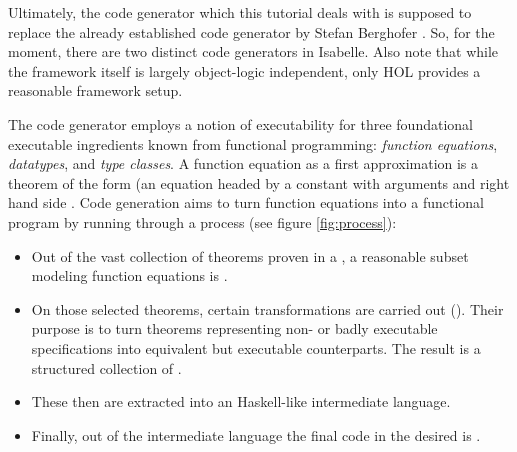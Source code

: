 \begin{isabellebody}
\begin{isamarkuptext}
  \begin{warn}
    Ultimately, the code generator which this tutorial deals with
    is supposed to replace the already established code generator
    by Stefan Berghofer \cite{Berghofer-Nipkow:2002}.
    So, for the moment, there are two distinct code generators
    in Isabelle.
    Also note that while the framework itself is largely
    object-logic independent, only HOL provides a reasonable
    framework setup.    
  \end{warn}%
\end{isamarkuptext}%
\isamarkuptrue%
%
\isamarkuptrue%
%
\begin{isamarkuptext}%
The code generator employs a notion of executability
  for three foundational executable ingredients known
  from functional programming:
  \emph{function equations}, \emph{datatypes}, and
  \emph{type classes}. A function equation as a first approximation
  is a theorem of the form 
  (an equation headed by a constant  with arguments
   and right hand side .
  Code generation aims to turn function equations
  into a functional program by running through
  a process (see figure \ref{fig:process}):

  \begin{itemize}

    \item Out of the vast collection of theorems proven in a
      , a reasonable subset modeling
      function equations is .

    \item On those selected theorems, certain
      transformations are carried out
      ().  Their purpose is to turn theorems
      representing non- or badly executable
      specifications into equivalent but executable counterparts.
      The result is a structured collection of .

    \item These  then are extracted
      into an Haskell-like intermediate
      language.

    \item Finally, out of the intermediate language the final
      code in the desired  is .


\end{itemize}
\end{isamarkuptext}
\end{isabellebody}
